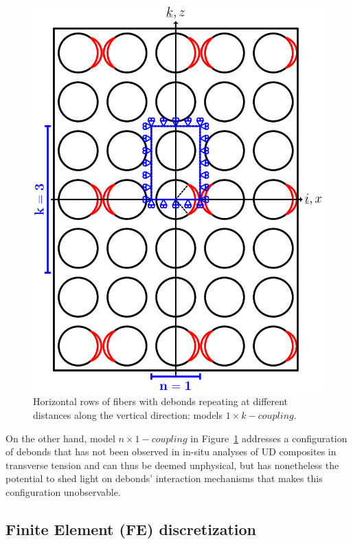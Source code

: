 \documentclass[review]{elsarticle}
\begin{document}
\begin{figure}[!h]
\centering
\includegraphics[width=\textwidth]{horizontalDebondLineRepeatingVertically.pdf}
\caption{Horizontal rows of fibers with debonds repeating at different distances along the vertical direction: models $1\times k-coupling$.}\label{fig:laminateModelsC}
\end{figure}

On the other hand, model $n\times 1-coupling$ in Figure~\ref{fig:laminateModelsC} addresses a configuration of debonds that has not been observed in in-situ analyses of UD composites in transverse tension and can thus be deemed unphysical, but has nonetheless the potential to shed light on debonds' interaction mechanisms that makes this configuration unobservable.

\subsection{Finite Element (FE) discretization}
\end{document}
